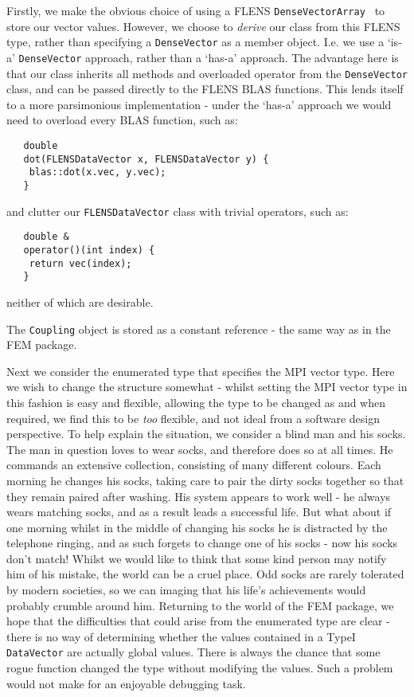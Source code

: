 Firstly, we make the obvious choice of using a FLENS \texttt{DenseVector\<Array\<\double\> \>} to store our vector values. However, we choose to \emph{derive} our class from this FLENS type, rather than specifying a \texttt{DenseVector} as a member object. I.e. we use a `is-a' \texttt{DenseVector} approach, rather than a `has-a' approach. The advantage here is that our class inherits all methods and overloaded operator from the \texttt{DenseVector} class, and can be passed directly to the FLENS BLAS functions. This lends itself to a more parsimonious implementation - under the `has-a' approach we would need to overload every BLAS function, such as: 
\begin{lstlisting}
   double
   dot(FLENSDataVector x, FLENSDataVector y) {
   	blas::dot(x.vec, y.vec);
   }
\end{lstlisting}

and clutter our \texttt{FLENSDataVector} class with trivial operators, such as:

\begin{lstlisting}
   double &
   operator()(int index) {
   	return vec(index);
   }
\end{lstlisting}

neither of which are desirable.

The \texttt{Coupling} object is stored as a constant reference - the same way as in the FEM package.

Next we consider the enumerated type that specifies the MPI vector type. Here we wish to change the structure somewhat - whilst setting the MPI vector type in this fashion is easy and flexible, allowing the type to be changed as and when required, we find this to be \emph{too} flexible, and not ideal from a software design perspective. To help explain the situation, we consider a blind man and his socks. The man in question loves to wear socks, and therefore does so at all times. He commands an extensive collection, consisting of many different colours. Each morning he changes his socks, taking care to pair the dirty socks together so that they remain paired after washing. His system appears to work well - he always wears matching socks, and as a result leads a successful life. But what about if one morning whilst in the middle of changing his socks he is distracted by the telephone ringing, and as such forgets to change one of his socks - now his socks don't match! Whilst we would like to think that some kind person may notify him of his mistake, the world can be a cruel place. Odd socks are rarely tolerated by modern societies, so we can imaging that his life's achievements would probably crumble around him. Returning to the world of the FEM package, we hope that the difficulties that could arise from the enumerated type are clear - there is no way of determining whether the values contained in a TypeI \texttt{DataVector} are actually global values. There is always the chance that some rogue function changed the type without modifying the values. Such a problem would not make for an enjoyable debugging task.

